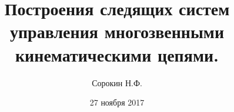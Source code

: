 \documentclass[12pt,a4paper,titlepage]{article}
\begin{document}
\date{27 ноября 2017}

\title{Построения следящих систем управления многозвенными кинематическими цепями.}
\author{Сорокин Н.Ф.}

\maketitle

\newcommand{\cinput}[1]{
	\newpage 
	
}

\cinput{src/introduction.tex}
\cinput{src/ctrobj.tex}
\cinput{src/htrans.tex}
\cinput{src/straight.tex}
\cinput{src/common.tex}
\cinput{src/inverse.tex}
\cinput{src/track.tex}
\cinput{src/lerp.tex}
\cinput{src/restr_coord.tex}
\cinput{src/restr_traj.tex}
\cinput{src/localbase.tex}
\cinput{src/tree.tex}
\cinput{src/findings.tex}
\end{document}
